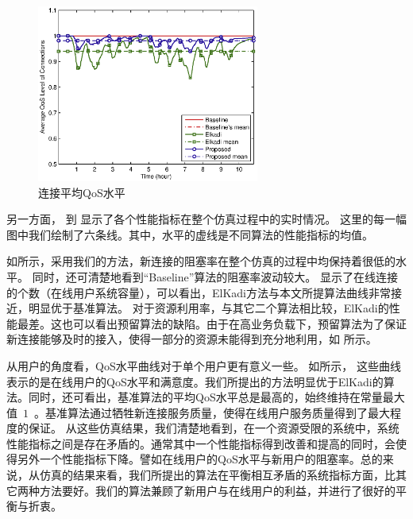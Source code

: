 % 
\begin{figure}[htbp]
\centering
\includegraphics[width=0.65\textwidth] {cacop_avg_qos.eps}
\caption{连接平均QoS水平}\label{fig:chap_cacop:clock_avg_call_qos}
\end{figure}



另一方面， 到  显示了各个性能指标在整个仿真过程中的实时情况。
这里的每一幅图中我们绘制了六条线。其中，水平的虚线是不同算法的性能指标的均值。

如所示，采用我们的方法，新连接的阻塞率在整个仿真的过程中均保持着很低的水平。
同时，还可清楚地看到“Baseline”算法的阻塞率波动较大。
 显示了在线连接的个数（在线用户系统容量），可以看出，ElKadi方法与本文所提算法曲线非常接近，明显优于基准算法。
对于资源利用率，与其它二个算法相比较，ElKadi的性能最差。这也可以看出预留算法的缺陷。由于在高业务负载下，预留算法为了保证新连接能够及时的接入，使得一部分的资源未能得到充分地利用，如 所示。
 
从用户的角度看，QoS水平曲线对于单个用户更有意义一些。
如所示，
这些曲线表示的是在线用户的QoS水平和满意度。我们所提出的方法明显优于ElKadi的算法。同时，还可看出，基准算法的平均QoS水平总是最高的，始终维持在常量最大值~$1$~。基准算法通过牺牲新连接服务质量，使得在线用户服务质量得到了最大程度的保证。
从这些仿真结果，我们清楚地看到，在一个资源受限的系统中，系统性能指标之间是存在矛盾的。通常其中一个性能指标得到改善和提高的同时，会使得另外一个性能指标下降。譬如在线用户的QoS水平与新用户的阻塞率。总的来说，从仿真的结果来看，我们所提出的算法在平衡相互矛盾的系统指标方面，比其它两种方法要好。我们的算法兼顾了新用户与在线用户的利益，并进行了很好的平衡与折衷。

